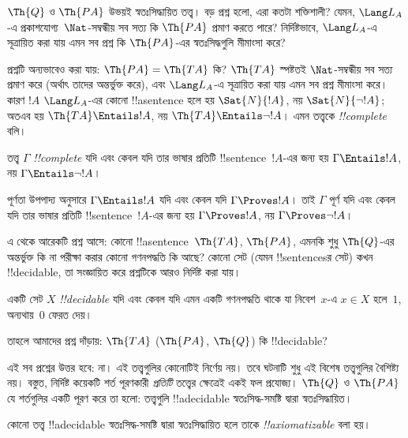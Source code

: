 \documentclass[../../../include/open-logic-section]{subfiles}
\begin{document}
$\Th{Q}$ ও $\Th{PA}$ উভয়ই স্বতঃসিদ্ধায়িত তত্ত্ব। বড় প্রশ্ন হলো, এরা কতটা
শক্তিশালী? যেমন, $\Lang L_A$-এ প্রকাশযোগ্য~$\Nat$-সম্বন্ধীয় সব সত্য কি
$\Th{PA}$ প্রমাণ করতে পারে? নির্দিষ্টভাবে, $\Lang L_A$-এ সূত্রায়িত করা যায়
এমন সব প্রশ্ন কি $\Th{PA}$-এর স্বতঃসিদ্ধগুলি মীমাংসা করে?

প্রশ্নটি অন্যভাবেও করা যায়: $\Th{PA} = \Th{TA}$ কি? $\Th{TA}$ স্পষ্টতই
$\Nat$-সম্বন্ধীয় সব সত্য প্রমাণ করে (অর্থাৎ তাদের অন্তর্ভুক্ত করে), এবং
$\Lang L_A$-এ সূত্রায়িত করা যায় এমন সব প্রশ্ন মীমাংসা করে। কারণ $!A$
$\Lang L_A$-এর কোনো !!a{sentence} হলে হয় $\Sat{N}{!A}$, নয়
$\Sat{N}{\lnot !A}$; অতএব হয় $\Th{TA} \Entails !A$, নয়
$\Th{TA} \Entails \lnot !A$। এমন তত্ত্বকে \emph{!!{complete}} বলি।

\begin{defn}
তত্ত্ব $\Gamma$ \emph{!!{complete}} যদি এবং কেবল যদি তার ভাষার প্রতিটি
!!{sentence}~$!A$-এর জন্য হয় $\Gamma \Entails !A$, নয়
$\Gamma \Entails \lnot !A$।
\end{defn}

\begin{explain}
পূর্ণতা উপপাদ্য অনুসারে $\Gamma \Entails !A$ যদি এবং কেবল যদি $\Gamma \Proves
!A$। তাই $\Gamma$ পূর্ণ যদি এবং কেবল যদি তার ভাষার প্রতিটি !!{sentence}~$!A$-এর
জন্য হয় $\Gamma \Proves !A$, নয় $\Gamma \Proves \lnot !A$।
\end{explain}

এ থেকে আরেকটি প্রশ্ন আসে: কোনো !!a{sentence}~$\Th{TA}$, $\Th{PA}$, এমনকি শুধু
$\Th{Q}$-এর অন্তর্ভুক্ত কি না পরীক্ষা করার কোনো গণনপদ্ধতি কি আছে? কোনো সেট
(যেমন !!{sentence}sর সেট) কখন !!{decidable}, তা সংজ্ঞায়িত করে প্রশ্নটিকে আরও
নির্দিষ্ট করা যায়।

\begin{defn}
একটি সেট $X$ \emph{!!{decidable}} যদি এবং কেবল যদি এমন একটি গণনপদ্ধতি থাকে
যা নিবেশ~$x$-এ $x \in X$ হলে~$1$, অন্যথায়~$0$ ফেরত দেয়।
\end{defn}

তাহলে আমাদের প্রশ্ন দাঁড়ায়: $\Th{TA}$ ($\Th{PA}$, $\Th{Q}$) কি !!{decidable}?

এই সব প্রশ্নের উত্তর হবে: না। এই তত্ত্বগুলির কোনোটিই নির্ণেয় নয়। তবে ঘটনাটি
শুধু এই বিশেষ তত্ত্বগুলির বৈশিষ্ট্য নয়। বস্তুত, নির্দিষ্ট কয়েকটি শর্ত পূরণকারী
\emph{প্রতিটি} তত্ত্বের ক্ষেত্রেই একই ফল প্রযোজ্য। $\Th{Q}$ ও $\Th{PA}$ যে
শর্তগুলির একটি পূরণ করে তা হলো: তত্ত্বগুলি !!a{decidable} স্বতঃসিদ্ধ-সমষ্টি
দ্বারা স্বতঃসিদ্ধায়িত।

\begin{defn}
কোনো তত্ত্ব !!a{decidable} স্বতঃসিদ্ধ-সমষ্টি দ্বারা স্বতঃসিদ্ধায়িত হলে তাকে
\emph{!!{axiomatizable}} বলা হয়।
\end{defn}
\end{document}

